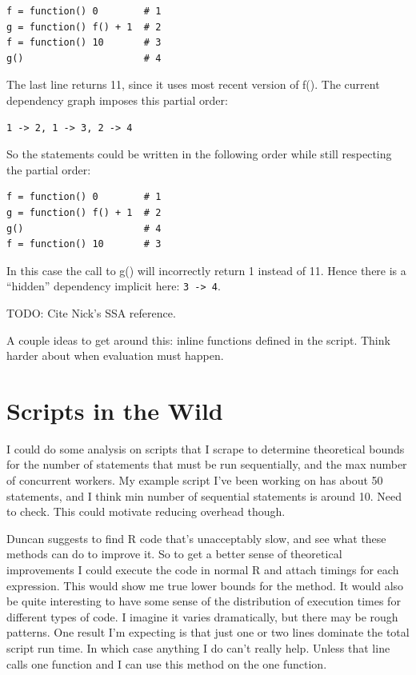 \documentclass[12pt]{article}
\begin{document}
\begin{verbatim}
f = function() 0        # 1
g = function() f() + 1  # 2
f = function() 10       # 3
g()                     # 4
\end{verbatim}

The last line returns 11, since it uses most recent version of f().
The current dependency graph imposes this partial order:

\begin{verbatim}
1 -> 2, 1 -> 3, 2 -> 4
\end{verbatim}

So the statements could be written in the following order while still respecting the
partial order:

\begin{verbatim}
f = function() 0        # 1
g = function() f() + 1  # 2
g()                     # 4
f = function() 10       # 3
\end{verbatim}

In this case the call to g() will incorrectly return 1 instead of 11.
Hence there is a ``hidden'' dependency implicit here: \texttt{3 -> 4}.

TODO: Cite Nick's SSA reference.

A couple ideas to get around this: inline functions defined in the script.
Think harder about when evaluation must happen.

\section{Scripts in the Wild}

I could do some analysis on scripts that I scrape to determine theoretical
bounds for the number of statements that must be run sequentially,
and the max number of concurrent workers. My example script I've been
working on has about 50 statements, and I think min number of sequential
statements is around 10. Need to check. This could motivate reducing
overhead though.

Duncan suggests to find R code that's unacceptably slow, and see what these
methods can do to improve it. So to get a better sense of theoretical
improvements I could execute the code in normal R and attach timings for
each expression. This would show me true lower bounds for the method. It
would also be quite interesting to have some sense of the distribution of
execution times for different types of code. I imagine it varies
dramatically, but there may be rough patterns. One result I'm expecting is
that just one or two lines dominate the total script run time. In which
case anything I do can't really help. Unless that line calls one function
and I can use this method on the one function.
\end{document}
